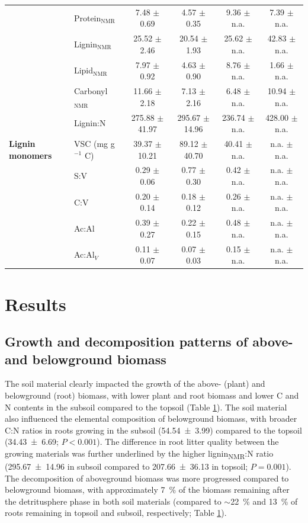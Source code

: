 \begin{table}[htbp]
\begin{tabular}{llcccc}
  & Protein$_{\text{NMR}}$ & 7.48 $\pm$ 0.69 & 4.57 $\pm$ 0.35 & 9.36 $\pm$ n.a. & 7.39 $\pm$ n.a. \\
  & Lignin$_{\text{NMR}}$ & 25.52 $\pm$ 2.46 & 20.54 $\pm$ 1.93 & 25.62 $\pm$ n.a. & 42.83 $\pm$ n.a. \\
  & Lipid$_{\text{NMR}}$ & 7.97 $\pm$ 0.92 & 4.63 $\pm$ 0.90 & 8.76 $\pm$ n.a. & 1.66 $\pm$ n.a. \\
  & Carbonyl$_{\text{NMR}}$ & 11.66 $\pm$ 2.18 & 7.13 $\pm$ 2.16 & 6.48 $\pm$ n.a. & 10.94 $\pm$ n.a. \\
  & Lignin:N & 275.88 $\pm$ 41.97 & 295.67 $\pm$ 14.96 & 236.74 $\pm$ n.a. & 428.00 $\pm$ n.a. \\
  \midrule
  \textbf{Lignin monomers} & VSC (mg g$^{-1}$ C) & 39.37 $\pm$ 10.21 & 89.12 $\pm$ 40.70 & 40.41 $\pm$ n.a. & n.a. $\pm$ n.a. \\
  & S:V & 0.29 $\pm$ 0.06 & 0.77 $\pm$ 0.30 & 0.42 $\pm$ n.a. & n.a. $\pm$ n.a. \\
  & C:V & 0.20 $\pm$ 0.14 & 0.18 $\pm$ 0.12 & 0.26 $\pm$ n.a. & n.a. $\pm$ n.a. \\
  & Ac:Al & 0.39 $\pm$ 0.27 & 0.22 $\pm$ 0.15 & 0.48 $\pm$ n.a. & n.a. $\pm$ n.a. \\
  & Ac:Al$_V$ & 0.11 $\pm$ 0.07 & 0.07 $\pm$ 0.03 & 0.15 $\pm$ n.a. & n.a. $\pm$ n.a. \\
  \bottomrule
  \end{tabular}
  \label{tab:M5-T1}
  \end{table}

\section{Results}
\subsection{Growth and decomposition patterns of above- and belowground
biomass}

The soil material clearly impacted the growth of the above- (plant) and belowground (root) biomass, with lower plant and root biomass and lower C and N contents in the subsoil compared to the topsoil (Table \ref{tab:M5-T1}). The soil material also influenced the elemental composition of belowground biomass, with broader C:N ratios in roots growing in the subsoil (\num{54.54 \pm 3.99}) compared to the topsoil (\num{34.43 \pm 6.69}; \(P < 0.001\)). The difference in root litter quality between the growing materials was further underlined by the higher lignin\textsubscript{NMR}:N ratio (\num{295.67 \pm 14.96} in subsoil compared to \num{207.66 \pm 36.13} in topsoil; \(P= 0.001\)). The decomposition of aboveground biomass was more progressed compared to belowground biomass, with approximately \SI{7}{\percent} of the biomass remaining after the detritusphere phase in both soil materials (compared to \(\sim\)\SI{22}{\percent} and \SI{13}{\percent} of roots remaining in topsoil and subsoil, respectively; Table \ref{tab:M5-T1}).


